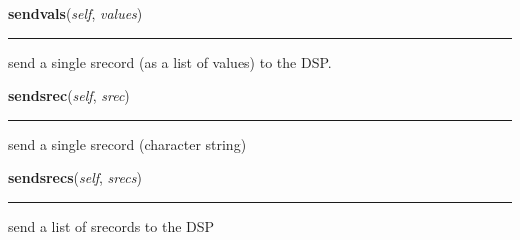     \label{sload:sloader:sendvals}

    \vspace{0.5ex}

    \begin{boxedminipage}{\textwidth}

    \raggedright \textbf{sendvals}(\textit{self}, \textit{values})

    \vspace{-1.5ex}

    \rule{\textwidth}{0.5\fboxrule}
    send a single srecord (as a list of values) to the DSP.

    \vspace{1ex}

    \end{boxedminipage}

    \label{sload:sloader:sendsrec}

    \vspace{0.5ex}

    \begin{boxedminipage}{\textwidth}

    \raggedright \textbf{sendsrec}(\textit{self}, \textit{srec})

    \vspace{-1.5ex}

    \rule{\textwidth}{0.5\fboxrule}
    send a single srecord (character string)

    \vspace{1ex}

    \end{boxedminipage}

    \label{sload:sloader:sendsrecs}

    \vspace{0.5ex}

    \begin{boxedminipage}{\textwidth}

    \raggedright \textbf{sendsrecs}(\textit{self}, \textit{srecs})

    \vspace{-1.5ex}

    \rule{\textwidth}{0.5\fboxrule}
    send a list of srecords to the DSP

    \vspace{1ex}

    \end{boxedminipage}

